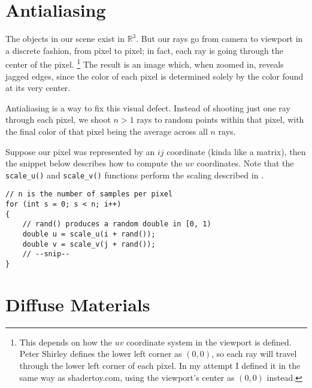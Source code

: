 \documentclass{scrartcl}
\newcommand{\cpp}[1]{\texttt{#1}}
\begin{document}
\section{Antialiasing}

The objects in our scene exist in $\mathbb{R}^3$.
But our rays go from camera to viewport in a discrete fashion, from pixel to pixel; in fact, each ray is going through the center of the pixel.
\footnote{This depends on how the $uv$ coordinate system in the viewport is defined. 
Peter Shirley defines the lower left corner as $(0,0)$, so each ray will travel through the lower left corner of each pixel.
In my attempt I defined it in the same way as shadertoy.com, using the viewport's center as $(0,0)$ instead.}
The result is an image which, when zoomed in, reveals jagged edges, since the color of each pixel is determined solely by the color found at its very center.

Antialiasing is a way to fix this visual defect.
Instead of shooting just one ray through each pixel, we shoot $n > 1$ rays to random points within that pixel, with the final color of that pixel being the average across all $n$ rays.

Suppose our pixel was represented by an $ij$ coordinate (kinda like a matrix), then the snippet below describes how to compute the $uv$ coordinates.
Note that the \cpp{scale_u()} and \cpp{scale_v()} functions perform the scaling described in .

\begin{verbatim}
// n is the number of samples per pixel
for (int s = 0; s < n; i++)
{
    // rand() produces a random double in [0, 1)
    double u = scale_u(i + rand());
    double v = scale_v(j + rand());
    // --snip--
}
\end{verbatim}

\section{Diffuse Materials}
\end{document}
